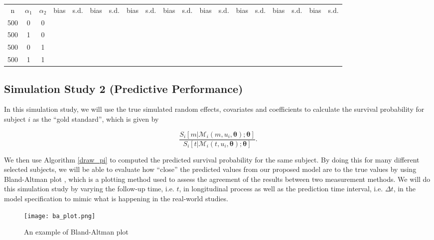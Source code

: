 \begin{sidewaystable}
\begin{center}
\begin{tabular}{ccccccccccccccccccc}
n & $\alpha_1$ & $\alpha_2$ & bias & s.d. & bias & s.d.& bias & s.d.& bias & s.d.& bias & s.d. & bias & s.d. & bias & s.d. & bias & s.d. \\
500 & 0 & 0 &   &   &   &   &   &   &   &   & 	& 	& 	& 	& 	&	&	\\
500 & 1 & 0 &   &   &   &   &   &   &   &   &   &   &   &   &   &   &   &  \\
500 & 0 & 1 & 	& 	& 	& 	& 	& 	& 	& 	& 	& 	& 	& 	& 	& 	& \\
500 & 1 & 1 & 	& 	& 	& 	& 	& 	& 	& 	& 	& 	& 	& 	& 	& 	& \\
\hline
\end{tabular} 
\label{tab:sim1} 
\end{center}
\end{sidewaystable}








\subsection{Simulation Study 2 (Predictive Performance)}
In this simulation study, we will use the true simulated random effects, covariates and coefficients to calculate the survival probability for subject $i$ as the ``gold standard'', which is given by

\[\frac{S_i[m|\mathcal{M}_i(m, u_i, \boldsymbol{\theta});\boldsymbol{\theta}]}{S_i[t|\mathcal{M}_i(t, u_i, \boldsymbol{\theta});\boldsymbol{\theta}]}.\]

We then use Algorithm \ref{draw_pi} to computed the predicted survival probability for the same subject. By doing this for many different selected subjects, we will be able to evaluate how ``close'' the predicted values from our proposed model are to the true values by using Bland-Altman plot \citep{bland1986statistical}, which is a plotting method used to assess the agreement of the results between two measurement methods. We will do this simulation study by varying the follow-up time, i.e. $t$, in longitudinal process as well as the prediction time interval, i.e. $\Delta t$, in the model specification to mimic what is happening in the real-world studies.

\begin{figure}[H]
\begin{center}
\label{plot:BA}
\texttt{[image: ba\_plot.png]}
\caption{An example of Bland-Altman plot}
\end{center}
\end{figure}


